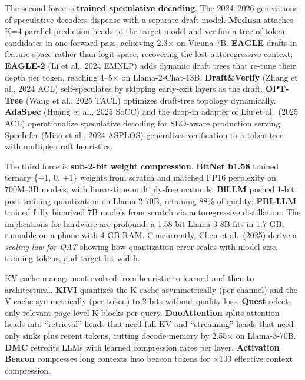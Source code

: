 \documentclass{article}
\begin{document}
The second force is \textbf{trained speculative decoding}. The 2024--2026 generations of speculative decoders dispense with a separate draft model. \textbf{Medusa} \citep{cai20242024} attaches K=4 parallel prediction heads to the target model and verifies a tree of token candidates in one forward pass, achieving 2.3× on Vicuna-7B. \textbf{EAGLE} \citep{li20242024} drafts in feature space rather than logit space, recovering the lost autoregressive context; \textbf{EAGLE-2} (Li et al., 2024 EMNLP) adds dynamic draft trees that re-tune their depth per token, reaching 4--5× on Llama-2-Chat-13B. \textbf{Draft\&Verify} (Zhang et al., 2024 ACL) self-speculates by skipping early-exit layers as the draft. \textbf{OPT-Tree} (Wang et al., 2025 TACL) optimizes draft-tree topology dynamically. \textbf{AdaSpec} (Huang et al., 2025 SoCC) and the drop-in adapter of Liu et al.~(2025 ACL) operationalize speculative decoding for SLO-aware production serving. SpecInfer (Miao et al., 2024 ASPLOS) generalizes verification to a token tree with multiple draft heuristics.

The third force is \textbf{sub-2-bit weight compression}. \textbf{BitNet b1.58} \citep{ma20242024} trained ternary \{−1, 0, +1\} weights from scratch and matched FP16 perplexity on 700M--3B models, with linear-time multiply-free matmuls. \textbf{BiLLM} \citep{huang20242024} pushed 1-bit post-training quantization on Llama-2-70B, retaining 88\% of quality; \textbf{FBI-LLM} \citep{ma20242024} trained fully binarized 7B models from scratch via autoregressive distillation. The implications for hardware are profound: a 1.58-bit Llama-3-8B fits in 1.7 GB, runnable on a phone with 4 GB RAM. Concurrently, Chen et al.~(2025) derive a \emph{scaling law for QAT} showing how quantization error scales with model size, training tokens, and target bit-width.

KV cache management evolved from heuristic to learned and then to architectural. \textbf{KIVI} quantizes the K cache asymmetrically (per-channel) and the V cache symmetrically (per-token) to 2 bits without quality loss. \textbf{Quest} \citep{tang20242024} selects only relevant page-level K blocks per query. \textbf{DuoAttention} \citep{xiao2024efficientstreaming} splits attention heads into ``retrieval'' heads that need full KV and ``streaming'' heads that need only sinks plus recent tokens, cutting decode memory by 2.55× on Llama-3-70B. \textbf{DMC} \citep{nawrot20242024} retrofits LLMs with learned compression rates per layer. \textbf{Activation Beacon} \citep{zhang20242024} compresses long contexts into beacon tokens for ×100 effective context compression.
\end{document}
